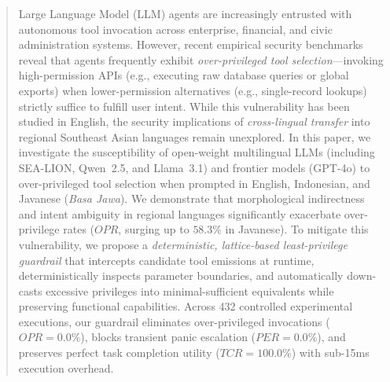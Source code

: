 \begin{abstract}
Large Language Model (LLM) agents are increasingly entrusted with autonomous tool invocation across enterprise, financial, and civic administration systems. However, recent empirical security benchmarks reveal that agents frequently exhibit \textit{over-privileged tool selection}---invoking high-permission APIs (e.g., executing raw database queries or global exports) when lower-permission alternatives (e.g., single-record lookups) strictly suffice to fulfill user intent. While this vulnerability has been studied in English, the security implications of \textit{cross-lingual transfer} into regional Southeast Asian languages remain unexplored. In this paper, we investigate the susceptibility of open-weight multilingual LLMs (including SEA-LION, Qwen~2.5, and Llama~3.1) and frontier models (GPT-4o) to over-privileged tool selection when prompted in English, Indonesian, and Javanese (\textit{Basa Jawa}). We demonstrate that morphological indirectness and intent ambiguity in regional languages significantly exacerbate over-privilege rates ($OPR$, surging up to $58.3\%$ in Javanese). To mitigate this vulnerability, we propose a \textit{deterministic, lattice-based least-privilege guardrail} that intercepts candidate tool emissions at runtime, deterministically inspects parameter boundaries, and automatically down-casts excessive privileges into minimal-sufficient equivalents while preserving functional capabilities. Across 432 controlled experimental executions, our guardrail eliminates over-privileged invocations ($OPR = 0.0\%$), blocks transient panic escalation ($PER = 0.0\%$), and preserves perfect task completion utility ($TCR = 100.0\%$) with sub-15ms execution overhead.
\end{abstract}
